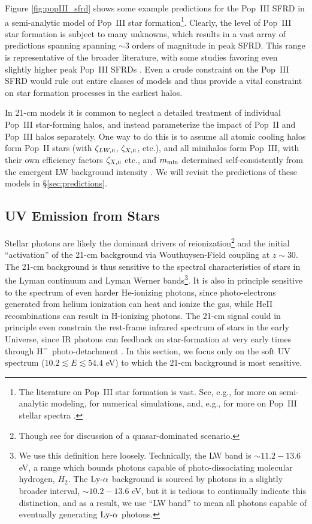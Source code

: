 Figure \ref{fig:popIII_sfrd} shows some example predictions for the Pop~III SFRD in a semi-analytic model of Pop~III star formation\footnote{The literature on Pop~III star formation is vast. See, e.g., \cite{Trenti2009,Crosby2013,Visbal2018,Mebane2018,Jaacks2018,Sarmento2018} for more on semi-analytic modeling, \cite{Abel,Bromm1999,Turk,OShea,Yoshida} for numerical simulations, and, e.g., \cite{Tumlinson2000,Bromm2001,Schaerer2002} for more on Pop~III stellar spectra .}. Clearly, the level of Pop~III star formation is subject to many unknowns, which results in a vast array of predictions spanning spanning $\sim 3$ orders of magnitude in peak SFRD. This range is representative of the broader literature, with some studies favoring even slightly higher peak Pop~III SFRDs \cite{Sarmento2008}. Even a crude constraint on the Pop~III SFRD would rule out entire classes of models and thus provide a vital constraint on star formation processes in the earliest halos.

In 21-cm models it is common to neglect a detailed treatment of individual Pop~III star-forming halos, and instead parameterize the impact of Pop~II and Pop~III halos separately. One way to do this is to assume all atomic cooling halos form Pop~II stars (with $\zeta_{LW,\textsc{ii}}$, $\zeta_{X,\textsc{ii}}$, etc.), and all minihalos form Pop~III, with their own efficiency factors $\zeta_{X,\textsc{ii}}$ etc., and $m_{\text{min}}$ determined self-consistently from the emergent LW background intensity \cite{Fialkov2014a,Mirocha2018}. We will revisit the predictions of these models in \S\ref{sec:predictions}.

\subsection{UV Emission from Stars} \label{sec:UV}
Stellar photons are likely the dominant drivers of reionization\footnote{Though see \cite{Madau2015} for discussion of a quasar-dominated scenario.} and the initial ``activation'' of the 21-cm background via Wouthuysen-Field coupling at $z \sim 30$. The 21-cm background is thus sensitive to the spectral characteristics of stars in the Lyman continuum and Lyman Werner bands\footnote{We use this definition here loosely. Technically, the LW band is $\sim 11.2-13.6$ eV, a range which bounds photons capable of photo-dissociating molecular hydrogen, $H_2$. The $\text{Ly-}\alpha$ background is sourced by photons in a slightly broader interval, $\sim 10.2-13.6$ eV, but it is tedious to continually indicate this distinction, and as a result, we use ``LW band'' to mean all photons capable of eventually generating $\text{Ly-}\alpha$ photons.}. It is also in principle sensitive to the spectrum of even harder He-ionizing photons, since photo-electrons generated from helium ionization can heat and ionize the gas, while HeII recombinations can result in H-ionizing photons. The 21-cm signal could in principle even constrain the rest-frame infrared spectrum of stars in the early Universe, since IR photons can feedback on star-formation at very early times through $\text{H}^{-}$ photo-detachment \cite{WolcottGreen2012}. In this section, we focus only on the soft UV spectrum ($10.2 \lesssim E \lesssim 54.4$ eV) to which the 21-cm background is most sensitive.


